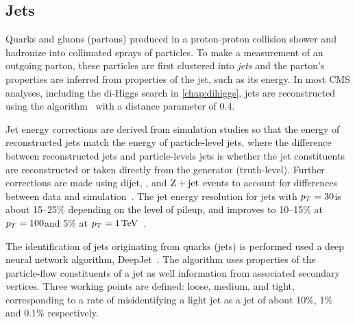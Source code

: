 \subsection{Jets}\label{sec:jet_reco}
Quarks and gluons (partons) produced in a proton-proton collision shower and hadronize into collimated sprays of particles. To make a measurement of an outgoing parton, these particles are first clustered into \textit{jets} and the parton's properties are inferred from properties of the jet, such as its energy. In most CMS analyses, including the di-Higgs search in \cref{chap:dihiggs}, jets are reconstructed using the \akt algorithm~\cite{Cacciari:2008gp,Cacciari:2011ma} with a distance parameter of 0.4. 

Jet energy corrections are derived from simulation studies so that the energy of reconstructed jets match the energy of particle-level jets, where the difference between reconstructed jets and particle-levels jets is whether the jet constituents are reconstructed or taken directly from the generator (truth-level). Further corrections are made using dijet, \gjet, and $\mathrm{Z}+\text{jet}$ events to account for differences between data and simulation~\cite{CMS:2016ljj,CMS-DP-2021-033}. The jet energy resolution for jets with $p_T=30$\GeV is about 15--25\% depending on the level of pileup, and improves to 10--15\% at $p_T=100$\GeV and 5\% at $p_T=1\,\text{Te\hspace{-.08em}V}$~\cite{CMS-DP-2021-033}.

The identification of jets originating from \Pqb quarks (\Pqb jets) is performed used a deep neural network algorithm, DeepJet~\cite{CMS-DP-2018-058}. The algorithm uses properties of the particle-flow constituents of a jet as well information from associated secondary vertices. Three working points are defined: loose, medium, and tight, corresponding to a rate of misidentifying a light jet as a \Pqb jet of about 10\%, 1\% and 0.1\% respectively. 